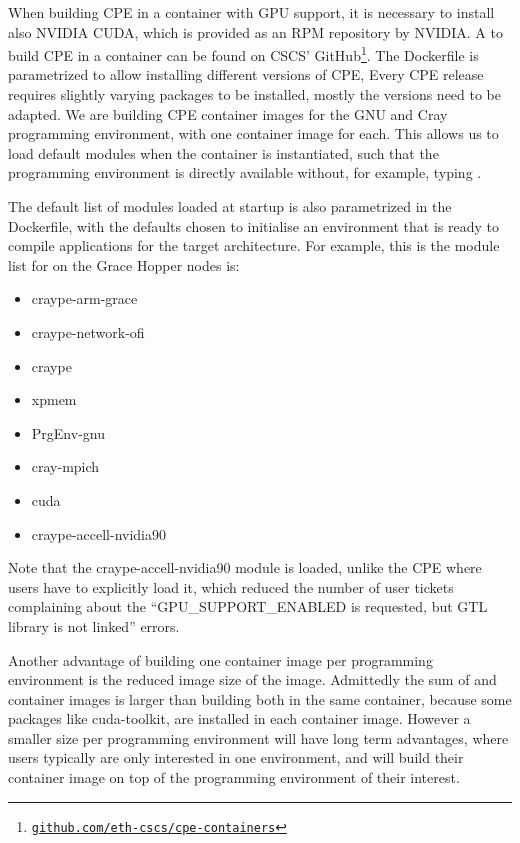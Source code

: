 When building CPE in a container with GPU support, it is necessary to install also NVIDIA CUDA, which is provided as an RPM repository by NVIDIA.
A  to build CPE in a container can be found on CSCS' GitHub\footnote{\href{https://github.com/eth-cscs/cpe-containers}{\lstinline{github.com/eth-cscs/cpe-containers}}}. The Dockerfile is parametrized to allow installing different versions of CPE,
Every CPE release requires slightly varying packages to be installed, mostly the versions need to be adapted.
We are building CPE container images for the GNU and Cray programming environment, with one container image for each.
This allows us to load default modules when the container is instantiated, such that the programming environment is directly available without, for example, typing .

The default list of modules loaded at startup is also parametrized in the Dockerfile, with the defaults chosen to initialise an environment that is ready to compile applications for the target architecture.
For example, this is the module list for  on the Grace Hopper nodes is:
\begin{itemize}
    \item craype-arm-grace
    \item craype-network-ofi
    \item craype
    \item xpmem
    \item PrgEnv-gnu
    \item cray-mpich
    \item cuda
    \item craype-accell-nvidia90
\end{itemize}
Note that the craype-accell-nvidia90 module is loaded, unlike the CPE where users have to explicitly load it, which reduced the number of user tickets complaining about the ``GPU\_SUPPORT\_ENABLED is requested, but GTL library is not linked'' errors.

Another advantage of building one container image per programming environment is the reduced image size of the image.
Admittedly the sum of  and  container images is larger than building both in the same container, because some packages like cuda-toolkit, are installed in each container image.
However a smaller size per programming environment will have long term advantages, where users typically are only interested in one environment, and will build their container image on top of the programming environment of their interest.

